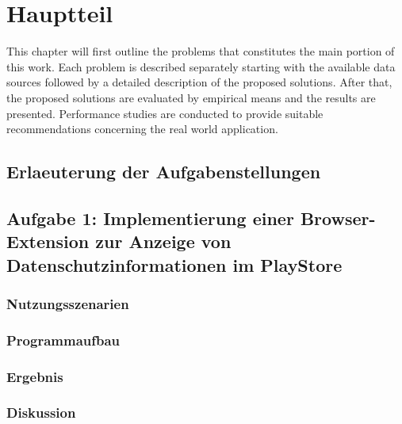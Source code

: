 \chapter{Hauptteil}
\label{c:hauptteil}

This chapter will first outline the problems that constitutes the main portion of this work. Each problem is described separately starting with the available data sources followed by a detailed description of the proposed solutions. After that, the proposed solutions are evaluated by empirical means and the results are presented. Performance studies are conducted to provide suitable recommendations concerning the real world application.



\section{Erlaeuterung der Aufgabenstellungen}
\label{s:erlaeuterungaufgabe}




\section{Aufgabe 1: Implementierung einer Browser-Extension zur Anzeige von Datenschutzinformationen im PlayStore}
\label{s:implementierungextension}


\subsection{Nutzungsszenarien}
\label{ss:nutzungsszenarien}


\subsection{Programmaufbau}
\label{ss:programmaufbau}


\subsection{Ergebnis}
\label{ss:ergebnisseht1}


\subsection{Diskussion}
\label{ss:diskussionht1}










